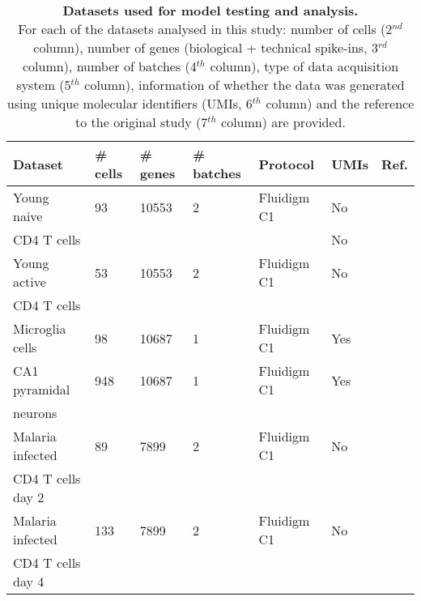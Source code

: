 \begin{table}[hb	]
\centering
\caption[Datasets used for model testing and analysis]{\textbf{Datasets used for model testing and analysis.} \\
For each of the datasets analysed in this study: number of cells (2$^{nd}$ column), number of genes (biological + technical spike-ins, 3$^{rd}$ column), number of batches (4$^{th}$ column), type of data acquisition system (5$^{th}$ column), information of whether the data was generated using unique molecular identifiers (UMIs, 6$^{th}$ column) and the reference to the original study (7$^{th}$ column) are provided.}
\label{tab2:datasets}
\begin{tabular}{lllllll}
\toprule
\textbf{Dataset} & \textbf{\# cells} & \textbf{\# genes} & \textbf{\# batches} & \textbf{Protocol} & \textbf{UMIs} & \textbf{Ref.}                       \\
\midrule
Young naive  & 93       & 10553    & 2          & Fluidigm C1       & No   & \citep{Martinez-jimenez2017} \\
CD4\plus{} T cells   &        &   &          &       & No   &  \\
\midrule

Young active    & 53       & 10553    & 2          & Fluidigm C1       & No   & \citep{Martinez-jimenez2017} \\
CD4\plus{} T cells    &        &     &           &        &    &  \\
\midrule

Microglia cells                         & 98       & 10687    & 1          & Fluidigm C1       & Yes  & \citep{Zeisel2015}           \\
\midrule

CA1 pyramidal                    & 948      & 10687    & 1          & Fluidigm C1       & Yes  & \citep{Zeisel2015}           \\
neurons       &       &     &           &       &   &           \\
\midrule

Malaria infected     & 89       & 7899     & 2          & Fluidigm C1       & No   & \citep{Lonnberg2017}         \\
CD4\plus{} T cells day 2     &        &      &          &  &    &  \\
\midrule

Malaria infected  & 133      & 7899     & 2          & Fluidigm C1       & No   & \citep{Lonnberg2017}         \\
CD4\plus{} T cells day 4     &       &      &    &  &    &\\
\midrule


\end{tabular}
\end{table}
